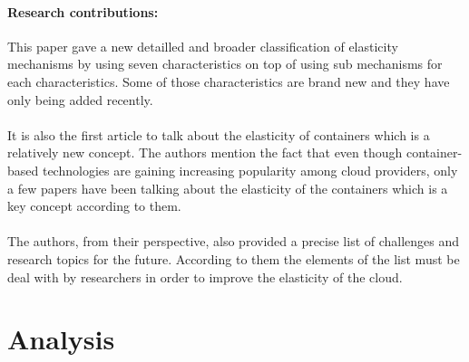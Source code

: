 \documentclass[11pt]{article}
\begin{document}
\paragraph{Research contributions:} This paper gave a new detailled and broader classification of elasticity mechanisms by using seven characteristics on top of using sub mechanisms for each characteristics. Some of those characteristics are brand new and they have only being added recently.
\\ \\
It is also the first article to talk about the elasticity of containers which is a relatively new concept. The authors mention the fact that even though container-based technologies are gaining increasing popularity among cloud providers, only a few papers have been talking about the elasticity of the containers which is a key concept according to them.
\\ \\
The authors, from their perspective, also provided a precise list of challenges and research topics for the future. According to them the elements of the list must be deal with by researchers in order to improve the elasticity of the cloud.
\section{Analysis}
\end{document}
